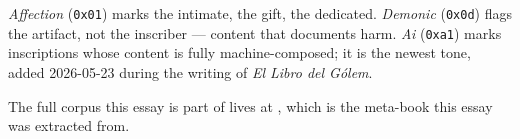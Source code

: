 \documentclass[essay,tone=ai]{../colegio}
\begin{document}
\emph{Affection} (\texttt{0x01}) marks the intimate, the gift, the
dedicated. \emph{Demonic} (\texttt{0x0d}) flags the artifact, not the
inscriber — content that documents harm. \emph{Ai} (\texttt{0xa1})
marks inscriptions whose content is fully machine-composed; it is
the newest tone, added 2026-05-23 during the writing of \emph{El
Libro del Gólem}.

The full corpus this essay is part of lives at
,
which is the meta-book this essay was extracted from.

\printbacknotes

\begin{colophon}
\end{colophon}
\end{document}
